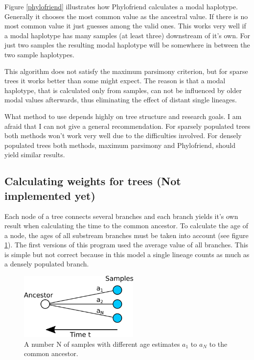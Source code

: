 Figure \ref{phylofriend} illustrates how Phylofriend calculates
a modal haplotype. Generally it chooses the most common value
as the ancestral value. If there is no most common value it
just guesses among the valid ones. This works very well if
a modal haplotype has many samples (at least three) downstream
of it's own. For just two samples the resulting modal haplotype
will be somewhere in between the two sample haplotypes.

This algorithm does not satisfy the maximum parsimony criterion,
but for sparse trees it works better than some might expect.
The reason is that a modal haplotype, that is calculated only
from samples, can not be influenced by older modal values afterwards,
thus eliminating the effect of distant single lineages.

What method to use depends highly on tree structure and
research goals. I am afraid that I can not give a general
recommendation. For sparsely populated trees both methods won't
work very well due to the difficulties involved.
For densely populated trees both methods, maximum parsimony
and Phylofriend, should yield similar results.


\subsection{\label{section_weights}Calculating weights for trees (Not implemented yet)}

Each node of a tree connects several branches and each branch
yields it's own result when calculating the time to the common
ancestor. To calculate the age of a node, the ages of all substream
branches must be taken into account (see figure \ref{weights}).
The first versions of this
program used the average value of all branches. This is simple
but not correct because in this model a single lineage counts as
much as a densely populated branch.

\begin{figure}[ht]
\centering
\includegraphics[width=5.9cm]{img/weights.png}
\caption{\label{weights} A number N of samples with different age
estimates $a_1$ to $a_N$ to the common ancestor.}
\end{figure}

